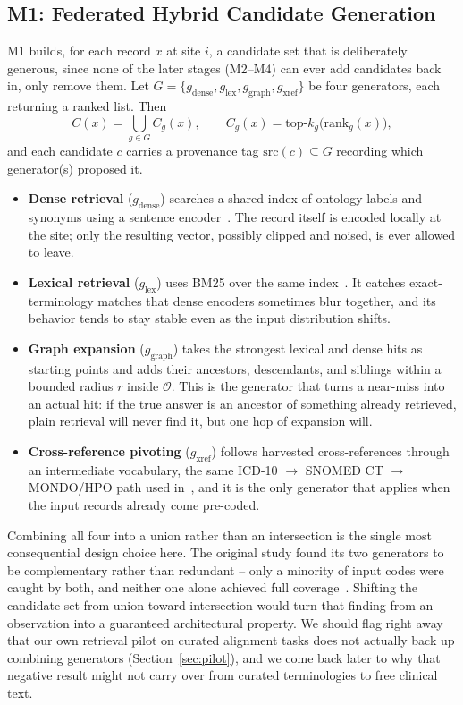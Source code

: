 \documentclass[conference]{IEEEtran}
\newcommand{\onto}{\mathcal{O}}
\begin{document}
\subsection{M1: Federated Hybrid Candidate Generation}

M1 builds, for each record $x$ at site $i$, a candidate set that is deliberately generous, since none of the later stages (M2--M4) can ever add candidates back in, only remove them. Let $G = \{g_{\mathrm{dense}}, g_{\mathrm{lex}}, g_{\mathrm{graph}}, g_{\mathrm{xref}}\}$ be four generators, each returning a ranked list. Then
\begin{equation}
C(x) = \bigcup_{g \in G} C_g(x), \qquad
C_g(x) = \mathrm{top}\text{-}k_g\big(\mathrm{rank}_g(x)\big),
\end{equation}
and each candidate $c$ carries a provenance tag $\mathrm{src}(c) \subseteq G$ recording which generator(s) proposed it.

\begin{itemize}
\item \textbf{Dense retrieval} ($g_{\mathrm{dense}}$) searches a shared index of ontology labels and synonyms using a sentence encoder~\cite{b18}. The record itself is encoded locally at the site; only the resulting vector, possibly clipped and noised, is ever allowed to leave.
\item \textbf{Lexical retrieval} ($g_{\mathrm{lex}}$) uses BM25 over the same index~\cite{b17}. It catches exact-terminology matches that dense encoders sometimes blur together, and its behavior tends to stay stable even as the input distribution shifts.
\item \textbf{Graph expansion} ($g_{\mathrm{graph}}$) takes the strongest lexical and dense hits as starting points and adds their ancestors, descendants, and siblings within a bounded radius $r$ inside $\onto$. This is the generator that turns a near-miss into an actual hit: if the true answer is an ancestor of something already retrieved, plain retrieval will never find it, but one hop of expansion will.
\item \textbf{Cross-reference pivoting} ($g_{\mathrm{xref}}$) follows harvested cross-references through an intermediate vocabulary, the same ICD-10 $\rightarrow$ SNOMED CT $\rightarrow$ MONDO/HPO path used in~\cite{b1}, and it is the only generator that applies when the input records already come pre-coded.
\end{itemize}

Combining all four into a union rather than an intersection is the single most consequential design choice here. The original study found its two generators to be complementary rather than redundant -- only a minority of input codes were caught by both, and neither one alone achieved full coverage~\cite{b1}. Shifting the candidate set from union toward intersection would turn that finding from an observation into a guaranteed architectural property. We should flag right away that our own retrieval pilot on curated alignment tasks does not actually back up combining generators (Section~\ref{sec:pilot}), and we come back later to why that negative result might not carry over from curated terminologies to free clinical text.
\end{document}
